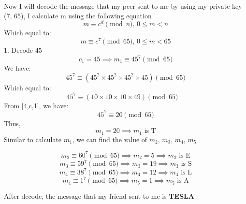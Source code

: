 \documentclass{article}
\begin{document}
\begin{enumerate}[label=({\alph*})]
		Now I will decode the message that my peer sent to me by using my private key (7, 65), I calculate m using the following equation
		\[m \equiv c^d \pmod{n} \text{, } 0 \leq m < n\]
		Which equal to:
		\[m \equiv c^7 \pmod{65} \text{, } 0 \leq m < 65\]
		1. Decode \(45\)
		\[c_{1} = 45 \implies m_{1} \equiv 45 ^ 7 \pmod{65}\]
		We have:
		\[45^7 \equiv (45^2 \times 45^2 \times 45^2 \times 45) \pmod{65}\]
		Which equal to:
		\begin{equation}
			45^7 \equiv (10 \times 10 \times 10 \times 49) \pmod{65} \quad \label{4,c,1}
		\end{equation}
		From \eqref{4,c,1}, we have:
		\[45^7 \equiv 20 \pmod{65}\]
		Thus, \[m_{1} = 20 \implies m_{1} \text{ is T}\]
		Similar to calculate \(m_{1}\), we can find the value of  \(m_{2}\), \(m_{3}\), \(m_{4}\), \(m_{5}\)

		\[m_{2} \equiv 60^7 \pmod{65} \implies m_{2} = 5 \implies m_{2} \text{ is E}\]
		\[m_{3} \equiv 59^7 \pmod{65} \implies m_{3} = 19 \implies m_{3} \text{ is S}\]
		\[m_{4} \equiv 38^7 \pmod{65} \implies m_{4} = 12 \implies m_{4} \text{ is L}\]
		\[m_{4} \equiv 1^7 \pmod{65} \implies m_{5} = 1 \implies m_{5} \text{ is A}\]

		After decode, the message that my friend sent to me is \textbf{TESLA}
		




		
	\end{enumerate}
\end{document}
